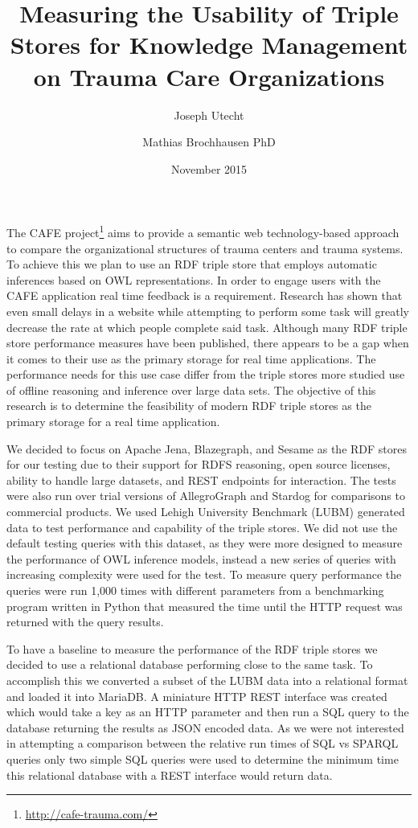 \documentclass{llncs}
\title{Measuring the Usability of Triple Stores for Knowledge Management on Trauma Care Organizations}
\author{Joseph Utecht \and Mathias Brochhausen PhD}
\institute{Department of Biomedical Informatics, University of Arkansas for Medical Sciences, Little Rock, AR}
\date{November 2015}
\begin{document}
\maketitle

The CAFE project\footnote{\url{http://cafe-trauma.com/}} aims to provide a semantic web technology-based approach to compare the organizational structures of trauma centers and trauma systems.
To achieve this we plan to use an RDF triple store that employs automatic inferences based on OWL representations.
In order to engage users with the CAFE application real time feedback is a requirement.
Research has shown that even small delays in a website while attempting to perform some task will greatly decrease the rate at which people complete said task\cite{Galletta2002}.
Although many RDF triple store performance measures have been published, there appears to be a gap when it comes to their use as the primary storage for real time applications.
The performance needs for this use case differ from the triple stores more studied use of offline reasoning and inference over large data sets.
The objective of this research is to determine the feasibility of modern RDF triple stores as the primary storage for a real time application.

We decided to focus on Apache Jena, Blazegraph, and Sesame as the RDF stores for our testing due to their support for RDFS reasoning, open source licenses, ability to handle large datasets, and REST endpoints for interaction.
The tests were also run over trial versions of AllegroGraph and Stardog for comparisons to commercial products.
We used Lehigh University Benchmark (LUBM)\cite{Guo2005} generated data to test performance and capability of the triple stores.
We did not use the default testing queries with this dataset, as they were more designed to measure the performance of OWL inference models, instead a new series of queries with increasing complexity were used for the test.
To measure query performance the queries were run 1,000 times with different parameters from a benchmarking program written in Python that measured the time until the HTTP request was returned with the query results.

To have a baseline to measure the performance of the RDF triple stores we decided to use a relational database performing close to the same task.
To accomplish this we converted a subset of the LUBM data into a relational format and loaded it into MariaDB.
A miniature HTTP REST interface was created which would take a key as an HTTP parameter and then run a SQL query to the database returning the results as JSON encoded data.
As we were not interested in attempting a comparison between the relative run times of SQL vs SPARQL queries only two simple SQL queries were used to determine the minimum time this relational database with a REST interface would return data.
\end{document}
